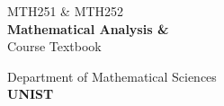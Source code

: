 \documentclass[11pt, a4paper, oneside]{book}
\begin{document}
\frontmatter
\begin{titlepage}
    \centering
    \vspace*{6cm}
    
    {\LARGE MTH251 \& MTH252}
    \\[0.5cm]
    {\Huge\bfseries Mathematical Analysis  \& }
    \\[1.5cm]
    {\LARGE Course Textbook}

    \vfill

    {\Large Department of Mathematical Sciences}
    \\[0.4cm]
    {\Large\bfseries UNIST}
\end{titlepage}

\clearpage
\thispagestyle{empty}

\begin{flushright}
\end{flushright}
\end{document}
